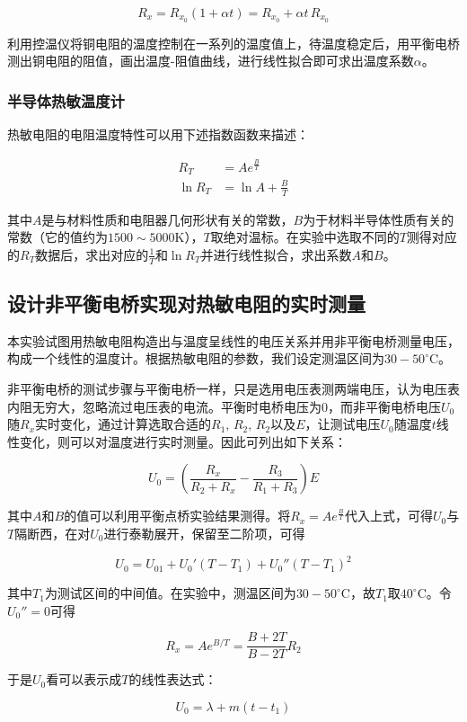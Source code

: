 \documentclass[12pt]{article}
\begin{document}
\[
    R_x=R_{x_0}(1+\alpha t)=R_{x_0}+\alpha t\,R_{x_0}
\]

利用控温仪将铜电阻的温度控制在一系列的温度值上，待温度稳定后，用平衡电桥测出铜电阻的阻值，画出温度-阻值曲线，进行线性拟合即可求出温度系数$\alpha$。

\subsubsection{半导体热敏温度计}
热敏电阻的电阻温度特性可以用下述指数函数来描述：

\[
    \begin{aligned}
        R_T&=Ae^{\frac{B}{T}} \\
        \ln R_T&=\ln A + \frac{B}{T}
    \end{aligned}
\]

其中$A$是与材料性质和电阻器几何形状有关的常数，$B$为于材料半导体性质有关的常数（它的值约为$1500\sim5000$K），$T$取绝对温标。在实验中选取不同的$T$测得对应的$R_T$数据后，求出对应的$\frac{1}{T}$和$\ln R_T$并进行线性拟合，求出系数$A$和$B$。

\subsection{设计非平衡电桥实现对热敏电阻的实时测量}
本实验试图用热敏电阻构造出与温度呈线性的电压关系并用非平衡电桥测量电压，构成一个线性的温度计。根据热敏电阻的参数，我们设定测温区间为$30-50^\circ\mathrm{C}$。

非平衡电桥的测试步骤与平衡电桥一样，只是选用电压表测两端电压，认为电压表内阻无穷大，忽略流过电压表的电流。平衡时电桥电压为0，而非平衡电桥电压$ U_0 $随$ R_x $实时变化，通过计算选取合适的$ R_1,\,R_2,\,R_2 $以及$ E $，让测试电压$ U_0 $随温度$ t $线性变化，则可以对温度进行实时测量。因此可列出如下关系：

\[
    U_0=\left(\frac{R_x}{R_2+R_x}-\frac{R_3}{R_1+R_3}\right)E
\]

其中$A$和$B$的值可以利用平衡点桥实验结果测得。将$R_x=Ae^{\frac{B}{T}}$代入上式，可得$U_0$与$T$隔断西，在对$U_0$进行泰勒展开，保留至二阶项，可得

\[
    U_0=U_{01}+U_0'(T-T_1)+U_0''(T-T_1)^2
\]

其中$T_1$为测试区间的中间值。在实验中，测温区间为$30-50^\circ\mathrm{C}$，故$T_1$取$40^\circ\mathrm{C}$。令$U_0''=0$可得

\[
    R_x=Ae^{B/T}=\frac{B+2T}{B-2T}R_2
\]

于是$U_0$看可以表示成$T$的线性表达式：

\[
    U_0=\lambda+m(t-t_1)
\]
\end{document}
